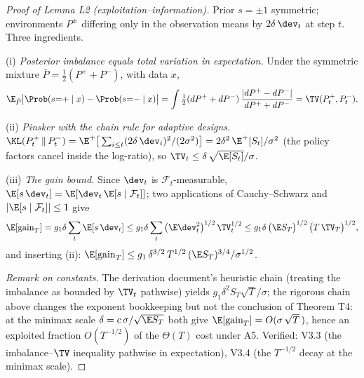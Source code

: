 \begin{proof}[Proof of Lemma L2 (exploitation--information)]
Prior $s = \pm 1$ symmetric; environments $P^{\pm}$ differing only in the
observation means by $2\delta\,\dev_t$ at step $t$. Three ingredients.

(i) \emph{Posterior imbalance equals total variation in expectation.} Under
the symmetric mixture $\bar P = \tfrac{1}{2}(P^+ + P^-)$, with data $x$,
\[
\E_{\bar P}\big|\Prob(s{=}{+}\mid x) - \Prob(s{=}{-}\mid x)\big|
 = \int \tfrac{1}{2}(dP^+ + dP^-)\,
   \frac{|dP^+ - dP^-|}{dP^+ + dP^-}
 = \TV(P^+_t, P^-_t).
\]

(ii) \emph{Pinsker with the chain rule for adaptive designs.}
$\KL(P^+_t \,\|\, P^-_t) = \E^{+}\big[\sum_{i\le t}(2\delta\,\dev_i)^2 /
(2\sigma^2)\big] = 2\delta^2\,\E^{+}[S_t]/\sigma^2$ (the policy factors
cancel inside the log-ratio), so
$\TV_t \le \delta\,\sqrt{\E[S_t]}/\sigma$.

(iii) \emph{The gain bound.} Since $\dev_t$ is
$\mathcal{F}_t$-measurable, $\E[s\,\dev_t] = \E[\dev_t\,\E[s\mid
\mathcal{F}_t]]$; two applications of Cauchy--Schwarz and
$|\E[s\mid\mathcal{F}_t]| \le 1$ give
\[
\E[\mathrm{gain}_T] = g_1\delta\sum_t \E[s\,\dev_t]
 \le g_1\delta \sum_t \big(\E \dev_t^2\big)^{1/2}\,\TV_t^{1/2}
 \le g_1\delta\,\big(\E S_T\big)^{1/2}\,\big(T\,\TV_T\big)^{1/2},
\]
and inserting (ii): $\E[\mathrm{gain}_T] \le g_1\,\delta^{3/2}\,
T^{1/2}\,(\E S_T)^{3/4}/\sigma^{1/2}$.

\emph{Remark on constants.} The derivation document's heuristic chain
(treating the imbalance as bounded by $\TV_t$ pathwise) yields
$g_1\delta^2 S_T\sqrt{T}/\sigma$; the rigorous chain above changes the
exponent bookkeeping but not the conclusion of Theorem T4: at the minimax
scale $\delta = c\,\sigma/\sqrt{\E S_T}$ both give
$\E[\mathrm{gain}_T] = O(\sigma\,\sqrt{T}\,)$, hence an exploited fraction
$O(T^{-1/2})$ of the $\Theta(T)$ cost under A5. Verified: V3.3 (the
imbalance--$\TV$ inequality pathwise in expectation), V3.4 (the
$T^{-1/2}$ decay at the minimax scale).
\end{proof}

